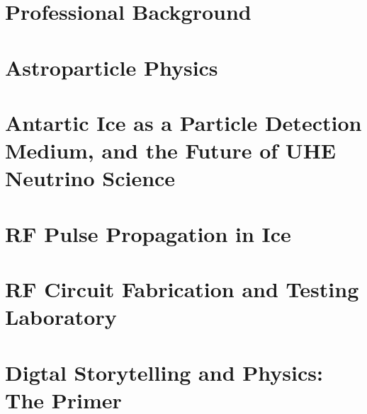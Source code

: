 \documentclass[../main.tex]{subfiles}
\begin{document}
\section{Professional Background}

\begin{flushleft}

\end{flushleft}

\section{Astroparticle Physics}

\begin{flushleft}

\end{flushleft}

\section{Antartic Ice as a Particle Detection Medium, and the Future of UHE Neutrino Science}

\begin{flushleft}

\end{flushleft}

\section{RF Pulse Propagation in Ice}

\begin{flushleft}

\end{flushleft}

\section{RF Circuit Fabrication and Testing Laboratory}

\begin{flushleft}

\end{flushleft}

\section{Digtal Storytelling and Physics: The Primer}

\begin{flushleft}

\end{flushleft}
\end{document}
